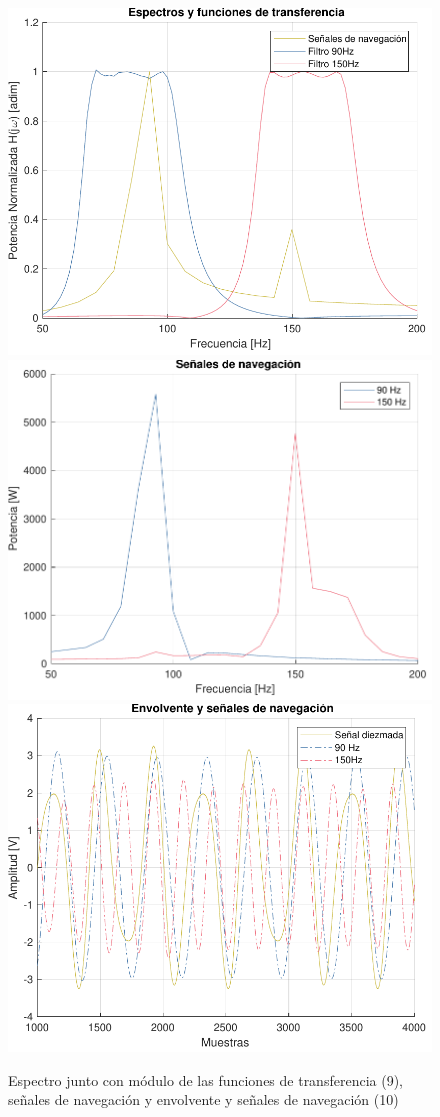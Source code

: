 \begin{figure}[!htb]
    \centering
    \includegraphics[width=0.45\linewidth]{include//figures/espectro.pdf}
    \includegraphics[width=0.45\linewidth]{include//figures/senales.pdf}
    \includegraphics[width=0.6\linewidth]{include//figures/envolvente+senales.pdf}
    \caption{Espectro junto con módulo de las funciones de transferencia (9), señales de navegación y envolvente y señales de navegación (10)} 
\end{figure}




